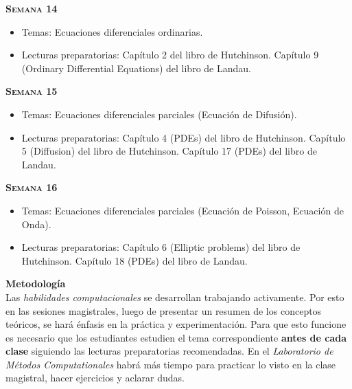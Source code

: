 \documentclass[letterpaper,10pt,onecolumn]{article}
\begin{document}
\noindent\textbf{\textsc{Semana 14}}\\[-0.5cm]
\begin{itemize}
\item Temas: Ecuaciones diferenciales ordinarias. \\[-0.6cm]
\item Lecturas preparatorias: Cap\'itulo 2 del libro de
  Hutchinson. Cap\'itulo 9 (Ordinary Differential Equations) del libro de Landau. \\[-0.6cm] 
\end{itemize}


\noindent\textbf{\textsc{Semana 15}}\\[-0.5cm]
\begin{itemize}
\item Temas: Ecuaciones diferenciales parciales (Ecuaci\'on de Difusi\'on).  \\[-0.6cm]
\item Lecturas preparatorias: Cap\'itulo 4 (PDEs) del libro de
  Hutchinson. Cap\'itulo 5 (Diffusion) del libro de Hutchinson. 
  Cap\'itulo 17 (PDEs) del libro de Landau. \\[-0.6cm] 
\end{itemize}

\noindent\textbf{\textsc{Semana 16}}\\[-0.5cm]
\begin{itemize}
\item Temas: Ecuaciones diferenciales parciales (Ecuaci\'on de Poisson, Ecuaci\'on de Onda).  \\[-0.6cm]
\item Lecturas preparatorias: Cap\'itulo 6 (Elliptic problems) del libro de
  Hutchinson. Cap\'itulo 18 (PDEs) del libro de
  Landau. \\[-0.6cm] 
\end{itemize}



\vspace*{0.5cm} 
\noindent\textbf{\large {} \quad
  Metodolog\'ia}\\[-0.2cm] 


\noindent\normalsize 
Las \emph{habilidades computacionales} se desarrollan trabajando activamente. 
Por esto en las sesiones magistrales, luego de presentar un resumen de
los conceptos te\'oricos, se har\'a \'enfasis en la pr\'actica y
experimentaci\'on.   
Para que esto funcione es necesario que los estudiantes estudien el
tema correspondiente {\bf antes de cada clase} siguiendo las lecturas
preparatorias recomendadas. En el \emph{Laboratorio de M\'etodos
  Computationales} habr\'a m\'as tiempo para practicar lo visto en la
clase magistral, hacer ejercicios y aclarar dudas.   
\end{document}
